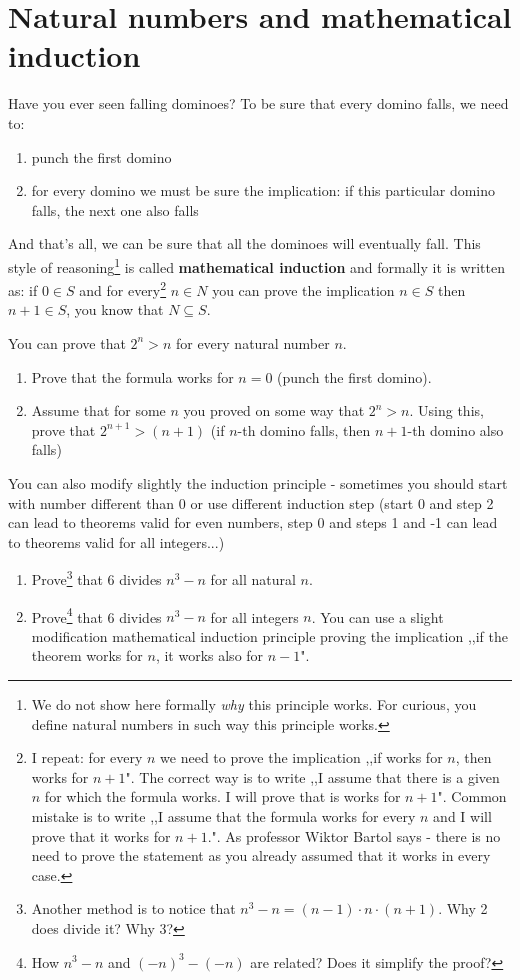 \section{Natural numbers and mathematical induction}
\label{sec:mathematical_induction}
Have you ever seen falling dominoes? To be sure that every domino falls, we need to:
\begin{enumerate}
	\item punch the first domino
	\item for every domino we must be sure the implication: if this particular domino falls, the next one also falls
\end{enumerate}
And that's all, we can be sure that all the dominoes will eventually fall. This style of reasoning\footnote{We do not show here formally \textit{why}
this principle works. For curious, you define natural numbers in such way this principle works.} is called \textbf{mathematical induction} and
formally it is written as: if $0\in S$ and for every\footnote{I repeat: for every $n$ we need to prove the implication ,,if works for $n$, then
works for $n+1$". The correct way is to write ,,I assume that there is a given $n$ for which the formula works. I will prove that is works for $n+1$".
Common mistake is to write ,,I assume that the formula works for every $n$ and I will prove that it works for $n+1$.". As professor Wiktor Bartol says
- there is no need to prove the statement as you already assumed that it works in every case.}
 $n\in N$ you can prove the implication $n\in S$ then $n+1\in S$, you know that $N\subseteq S$.
\begin{prob}
	You can prove that $2^n>n$ for every natural number $n$.
	\begin{enumerate}
		\item Prove that the formula works for $n=0$ (punch the first domino).
		\item Assume that for some $n$ you proved on some way that $2^n>n$. Using this, prove that $2^{n+1}>(n+1)$ (if $n$-th domino falls, then
		$n+1$-th domino also falls)
	\end{enumerate}
\end{prob}

\noindent You can also modify slightly the induction principle - sometimes you should start with number different than 0 or use different induction step
(start 0 and step 2 can lead to theorems valid for even numbers, step 0 and steps 1 and -1 can lead to theorems valid for all integers...)
\begin{prob}
    \begin{enumerate}
	   \item Prove\footnote{Another method is to notice that $n^3-n=(n-1)\cdot n\cdot (n+1)$. Why 2 does divide it? Why 3?} that 6 divides
		     $n^3-n$ for all natural $n$.
	    \item Prove\footnote{How $n^3-n$ and $(-n)^3-(-n)$ are related? Does it simplify the proof?} that 6 divides $n^3-n$ for all integers $n$.
		      You can use a slight modification mathematical induction principle proving the implication
		      ,,if the theorem works for $n$, it works also for $n-1$".
    \end{enumerate}
\end{prob}


